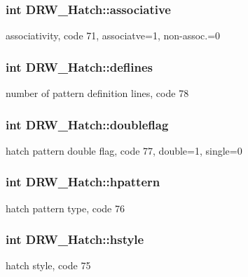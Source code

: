 \subsubsection[{associative}]{\setlength{\rightskip}{0pt plus 5cm}int D\+R\+W\+\_\+\+Hatch\+::associative}\label{class_d_r_w___hatch_af152cba96e8bd0471aafd2764defe458}
associativity, code 71, associatve=1, non-\/assoc.=0 \hypertarget{class_d_r_w___hatch_a15bd241e3c34d82c35db31470fe25741}{}
\subsubsection[{deflines}]{\setlength{\rightskip}{0pt plus 5cm}int D\+R\+W\+\_\+\+Hatch\+::deflines}\label{class_d_r_w___hatch_a15bd241e3c34d82c35db31470fe25741}
number of pattern definition lines, code 78 \hypertarget{class_d_r_w___hatch_a06da8a64445bd9e5c159dab4243c992a}{}
\subsubsection[{doubleflag}]{\setlength{\rightskip}{0pt plus 5cm}int D\+R\+W\+\_\+\+Hatch\+::doubleflag}\label{class_d_r_w___hatch_a06da8a64445bd9e5c159dab4243c992a}
hatch pattern double flag, code 77, double=1, single=0 \hypertarget{class_d_r_w___hatch_abb23290d594b69e7b9c18ece2de7ec8e}{}
\subsubsection[{hpattern}]{\setlength{\rightskip}{0pt plus 5cm}int D\+R\+W\+\_\+\+Hatch\+::hpattern}\label{class_d_r_w___hatch_abb23290d594b69e7b9c18ece2de7ec8e}
hatch pattern type, code 76 \hypertarget{class_d_r_w___hatch_a7b8950911e5fb319f0d63b7ee2251f87}{}
\subsubsection[{hstyle}]{\setlength{\rightskip}{0pt plus 5cm}int D\+R\+W\+\_\+\+Hatch\+::hstyle}\label{class_d_r_w___hatch_a7b8950911e5fb319f0d63b7ee2251f87}
hatch style, code 75 \hypertarget{class_d_r_w___hatch_a2da61f1c2549cf8dacd0a0bb13366d56}{}
